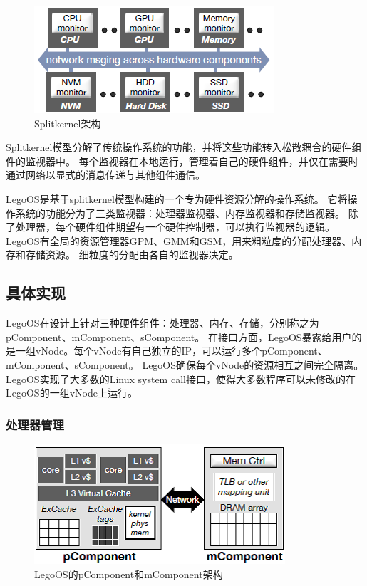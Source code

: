 \begin{figure}[h]
\centering
\includegraphics[scale=1.00]{Figures/system/splitkernel.png}
\decoRule
\caption{Splitkernel架构}    %
\label{fig:legoos_archiecture}
\end{figure}

Splitkernel模型分解了传统操作系统的功能，并将这些功能转入松散耦合的硬件组件的监视器中。
每个监视器在本地运行，管理着自己的硬件组件，并仅在需要时通过网络以显式的消息传递与其他组件通信。

LegoOS是基于splitkernel模型构建的一个专为硬件资源分解的操作系统。
它将操作系统的功能分为了三类监视器：处理器监视器、内存监视器和存储监视器。
除了处理器，每个硬件组件期望有一个硬件控制器，可以执行监视器的逻辑。
LegoOS有全局的资源管理器GPM、GMM和GSM，用来粗粒度的分配处理器、内存和存储资源。
细粒度的分配由各自的监视器决定。

\subsection{具体实现}

LegoOS在设计上针对三种硬件组件：处理器、内存、存储，分别称之为pComponent、mComponent、sComponent。
在接口方面，LegoOS暴露给用户的是一组vNode。每个vNode有自己独立的IP，可以运行多个pComponent、mComponent、sComponent。
LegoOS确保每个vNode的资源相互之间完全隔离。
LegoOS实现了大多数的Linux system call接口，使得大多数程序可以未修改的在LegoOS的一组vNode上运行。

\subsubsection{处理器管理}

\begin{figure}[h]
\centering
\includegraphics[scale=1.00]{Figures/system/pcomponent_mcomponent.png}
\decoRule
\caption{LegoOS的pComponent和mComponent架构}    %
\label{fig:legoos_archiecture}
\end{figure}

